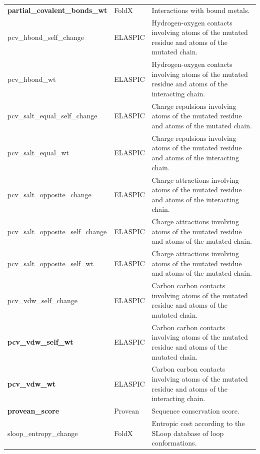 \begin{table}[!htb]
\begin{tabular}{ l | l | p{8cm} }
		\textbf{partial\_covalent\_bonds\_wt} & FoldX          & Interactions with bound metals.                                                                     \\
		pcv\_hbond\_self\_change              & ELASPIC        & Hydrogen-oxygen contacts involving atoms of the mutated residue and atoms of the mutated chain.     \\
		pcv\_hbond\_wt                        & ELASPIC        & Hydrogen-oxygen contacts involving atoms of the mutated residue and atoms of the interacting chain. \\
		pcv\_salt\_equal\_self\_change        & ELASPIC        & Charge repulsions involving atoms of the mutated residue and atoms of the mutated chain.            \\
		pcv\_salt\_equal\_wt                  & ELASPIC        & Charge repulsions involving atoms of the mutated residue and atoms of the interacting chain.        \\
		pcv\_salt\_opposite\_change           & ELASPIC        & Charge attractions involving atoms of the mutated residue and atoms of the interacting chain.       \\
		pcv\_salt\_opposite\_self\_change     & ELASPIC        & Charge attractions involving atoms of the mutated residue and atoms of the mutated chain.           \\
		pcv\_salt\_opposite\_self\_wt         & ELASPIC        & Charge attractions involving atoms of the mutated residue and atoms of the mutated chain.           \\
		pcv\_vdw\_self\_change                & ELASPIC        & Carbon carbon contacts involving atoms of the mutated residue and atoms of the mutated chain.       \\
		\textbf{pcv\_vdw\_self\_wt}           & ELASPIC        & Carbon carbon contacts involving atoms of the mutated residue and atoms of the mutated chain.       \\
		\textbf{pcv\_vdw\_wt}                 & ELASPIC        & Carbon carbon contacts involving atoms of the mutated residue and atoms of the interacting chain.   \\
		\textbf{provean\_score}               & Provean        & Sequence conservation score.                                                                        \\
		sloop\_entropy\_change                & FoldX          & Entropic cost according to the SLoop database of loop conformations.                                \\

\end{tabular}
\end{table}
